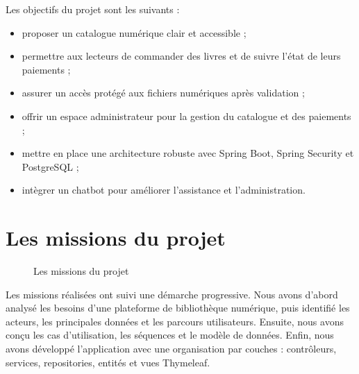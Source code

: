 \documentclass[12pt,a4paper]{report}
\begin{document}
Les objectifs du projet sont les suivants :

\begin{itemize}
    \item proposer un catalogue numérique clair et accessible ;
    \item permettre aux lecteurs de commander des livres et de suivre l'état de leurs paiements ;
    \item assurer un accès protégé aux fichiers numériques après validation ;
    \item offrir un espace administrateur pour la gestion du catalogue et des paiements ;
    \item mettre en place une architecture robuste avec Spring Boot, Spring Security et PostgreSQL ;
    \item intègrer un chatbot pour améliorer l'assistance et l'administration.
\end{itemize}

\section{Les missions du projet}

\begin{figure}[!htbp]
    \centering
    \caption{Les missions du projet}
\end{figure}

Les missions réalisées ont suivi une démarche progressive. Nous avons d'abord analysé les besoins d'une plateforme de bibliothèque numérique, puis identifié les acteurs, les principales données et les parcours utilisateurs. Ensuite, nous avons conçu les cas d'utilisation, les séquences et le modèle de données. Enfin, nous avons développé l'application avec une organisation par couches : contrôleurs, services, repositories, entités et vues Thymeleaf.
\end{document}
